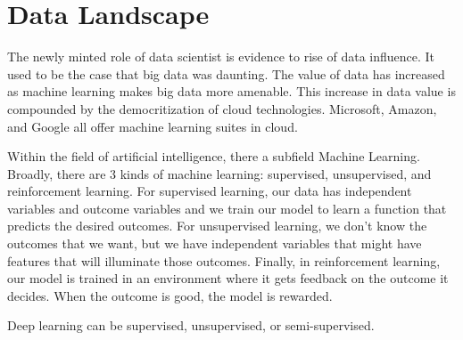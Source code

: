 \section{Data Landscape}

The newly minted role of data scientist is evidence to rise of data influence.
It used to be the case that big data was daunting. The value of data has
increased as machine learning makes big data more amenable. This increase in data value
is compounded by the democritization of cloud technologies. Microsoft, Amazon, and Google
all offer machine learning suites in cloud.




Within the field of artificial intelligence, there a subfield Machine Learning.
Broadly, there are 3 kinds of machine learning: supervised, unsupervised, and
reinforcement learning. For supervised learning, our data has independent
variables and outcome variables and we train our model to learn a function that
predicts the desired outcomes. For unsupervised learning, we don't know the
outcomes that we want, but we have independent variables that might have
features that will illuminate those outcomes. Finally, in reinforcement
learning, our model is trained in an environment where it gets feedback on the
outcome it decides. When the outcome is good, the model is rewarded.

Deep learning can be supervised, unsupervised, or semi-supervised.
